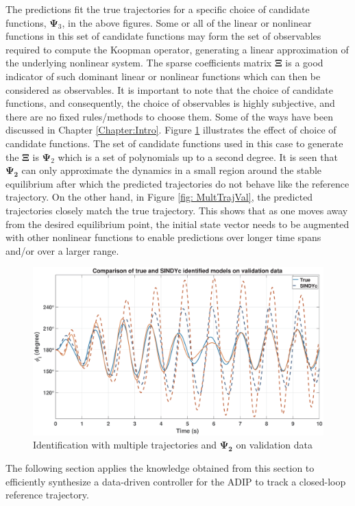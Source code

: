 % 
\newpage
The predictions fit the true trajectories for a specific choice of candidate functions, $\mathbf{\Psi}_3$, in the above figures. Some or all of the linear or nonlinear functions in this set of candidate functions may form the set of observables required to compute the Koopman operator, generating a linear approximation of the underlying nonlinear system. The sparse coefficients matrix $\mathbf{\Xi}$ is a good indicator of such dominant linear or nonlinear functions which can then be considered as observables. It is important to note that the choice of candidate functions, and consequently, the choice of observables is highly subjective, and there are no fixed rules/methods to choose them. Some of the ways have been discussed in Chapter \ref{Chapter:Intro}. Figure \ref{fig: MultTrajVal2} illustrates the effect of choice of candidate functions. The set of candidate functions used in this case to generate the $\mathbf{\Xi} $ is $\mathbf{\Psi}_2$ which is a set of polynomials up to a second degree. It is seen that $\mathbf{\Psi_2}$ can only approximate the dynamics in a small region around the stable equilibrium after which the predicted trajectories do not behave like the reference trajectory. On the other hand, in Figure \ref{fig: MultTrajVal}, the predicted trajectories closely match the true trajectory. This shows that as one moves away from the desired equilibrium point, the initial state vector needs to be augmented with other nonlinear functions to enable predictions over longer time spans and/or over a larger range.
% 
\begin{figure}[H]
    \centering
    \includegraphics[width=1\linewidth]{figures/MultTrajVal_2_0_0}
    \caption{Identification with multiple trajectories and $\mathbf{\Psi_2}$ on validation data}
    \label{fig: MultTrajVal2}
\end{figure}
% 
The following section applies the knowledge obtained from this section to efficiently synthesize a data-driven controller for the ADIP to track a closed-loop reference trajectory.\newpage
